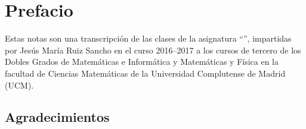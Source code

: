 \section*{Prefacio}
\label{pref}
Estas notas son una transcripción de las clases de la asignatura ``'', impartidas por Jesús María Ruiz Sancho en el curso 2016--2017 a los cursos de tercero de los Dobles Grados de Matemáticas e Informática y Matemáticas y Física en la facultad de Ciencias Matemáticas de la Universidad Complutense de Madrid (UCM).

\subsection*{Agradecimientos}